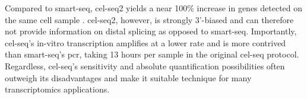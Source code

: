 Compared to \acrshort{smart-seq}, \acrshort{cel-seq}2 yields a near 100\% increase in genes detected on the same cell sample \citep{hashimshony2016}. \acrshort{cel-seq}2, however, is strongly 3'-biased and can therefore not provide information on distal splicing as opposed to \acrshort{smart-seq}. Importantly, \acrshort{cel-seq}'s in-vitro transcription amplifies at a lower rate and is more contrived than \acrshort{smart-seq}'s \acrshort{pcr}, taking 13 hours per sample in the original \acrshort{cel-seq} protocol. Regardless, \acrshort{cel-seq}'s sensitivity and absolute quantification possibilities often outweigh its disadvantages and make it suitable technique for many transcriptomics applications.\pms

%
